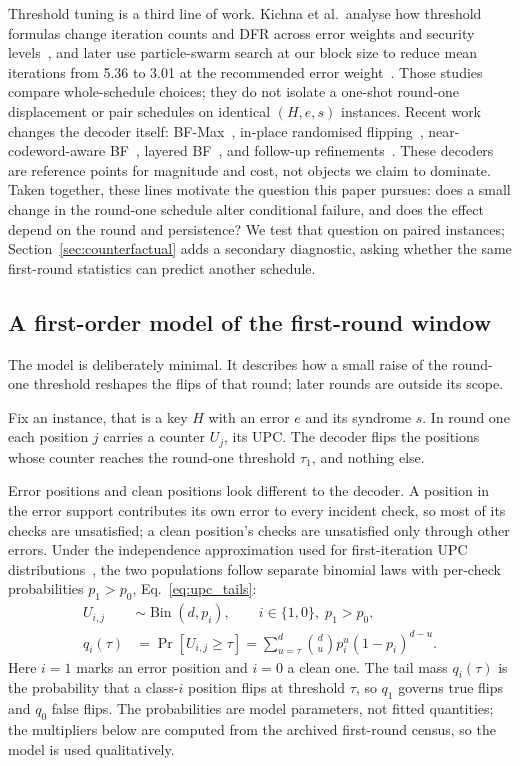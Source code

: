 \documentclass[letterpaper,journal]{IEEEtran}
\begin{document}
Threshold tuning is a third line of work. Kichna et al.\ analyse how threshold formulas change iteration counts and DFR across error weights and security levels~\cite{kichna2024thresholds}, and later use particle-swarm search at our block size to reduce mean iterations from 5.36 to 3.01 at the recommended error weight~\cite{kichna2025pso}. Those studies compare whole-schedule choices; they do not isolate a one-shot round-one displacement or pair schedules on identical $(H,e,s)$ instances. Recent work changes the decoder itself: BF-Max~\cite{baldelli2025bfmax}, in-place randomised flipping~\cite{baldi2021inplace}, near-codeword-aware BF~\cite{baldelli2026ncw}, layered BF~\cite{cai2025layered}, and follow-up refinements~\cite{santini2026flip}. These decoders are reference points for magnitude and cost, not objects we claim to dominate. Taken together, these lines motivate the question this paper pursues: does a small change in the round-one schedule alter conditional failure, and does the effect depend on the round and persistence? We test that question on paired instances; Section~\ref{sec:counterfactual} adds a secondary diagnostic, asking whether the same first-round statistics can predict another schedule.
\subsection{A first-order model of the first-round window}\label{sec:model}

The model is deliberately minimal. It describes how a small raise of the round-one threshold reshapes the flips of that round; later rounds are outside its scope.

Fix an instance, that is a key $H$ with an error $e$ and its syndrome $s$. In round one each position $j$ carries a counter $U_j$, its UPC. The decoder flips the positions whose counter reaches the round-one threshold $\tau_1$, and nothing else.

Error positions and clean positions look different to the decoder. A position in the error support contributes its own error to every incident check, so most of its checks are unsatisfied; a clean position's checks are unsatisfied only through other errors. Under the independence approximation used for first-iteration UPC distributions~\cite{annechini2024estimation}, the two populations follow separate binomial laws with per-check probabilities $p_1>p_0$, Eq.~\eqref{eq:upc_tails}:
\begin{equation}\label{eq:upc_tails}
\begin{aligned}
U_{i,j} &\sim \operatorname{Bin}(d,p_i), \qquad i\in\{1,0\},\; p_1>p_0,\\
q_i(\tau) &= \Pr[U_{i,j}\ge\tau]
= \textstyle\sum_{u=\tau}^{d}\binom{d}{u}p_i^{u}(1-p_i)^{d-u}.
\end{aligned}
\end{equation}
Here $i=1$ marks an error position and $i=0$ a clean one. The tail mass $q_i(\tau)$ is the probability that a class-$i$ position flips at threshold $\tau$, so $q_1$ governs true flips and $q_0$ false flips. The probabilities are model parameters, not fitted quantities; the multipliers below are computed from the archived first-round census, so the model is used qualitatively.
\end{document}

